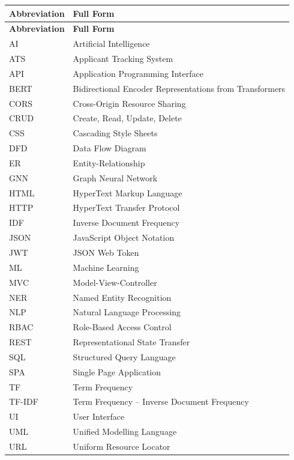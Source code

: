 \documentclass[12pt,a4paper]{report}
\begin{document}
\noindent
\begin{longtable}{p{} p{}}
\toprule
\textbf{Abbreviation} & \textbf{Full Form} \\
\midrule
\endfirsthead
\toprule
\textbf{Abbreviation} & \textbf{Full Form} \\
\midrule
\endhead
AI    & Artificial Intelligence \\
ATS   & Applicant Tracking System \\
API   & Application Programming Interface \\
BERT  & Bidirectional Encoder Representations from Transformers \\
CORS  & Cross-Origin Resource Sharing \\
CRUD  & Create, Read, Update, Delete \\
CSS   & Cascading Style Sheets \\
DFD   & Data Flow Diagram \\
ER    & Entity-Relationship \\
GNN   & Graph Neural Network \\
HTML  & HyperText Markup Language \\
HTTP  & HyperText Transfer Protocol \\
IDF   & Inverse Document Frequency \\
JSON  & JavaScript Object Notation \\
JWT   & JSON Web Token \\
ML    & Machine Learning \\
MVC   & Model-View-Controller \\
NER   & Named Entity Recognition \\
NLP   & Natural Language Processing \\
RBAC  & Role-Based Access Control \\
REST  & Representational State Transfer \\
SQL   & Structured Query Language \\
SPA   & Single Page Application \\
TF    & Term Frequency \\
TF-IDF & Term Frequency -- Inverse Document Frequency \\
UI    & User Interface \\
UML   & Unified Modelling Language \\
URL   & Uniform Resource Locator \\
\bottomrule
\end{longtable}
\clearpage
\end{document}
